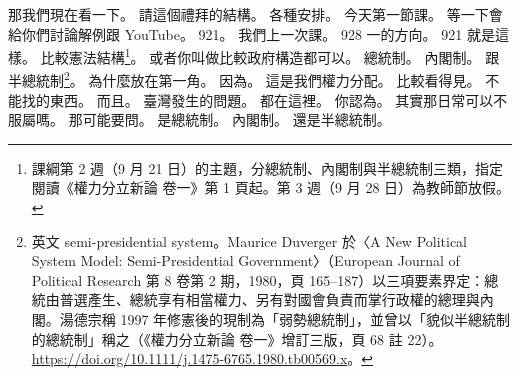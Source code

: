 \hypertarget{c01:cue:1122}{}那我們現在看一下。
\hypertarget{c01:cue:1123}{}請這個禮拜的結構。
\hypertarget{c01:cue:1124}{}各種安排。
\hypertarget{c01:cue:1125}{}今天第一節課。
\hypertarget{c01:cue:1126}{}等一下會給你們討論解例跟 YouTube。
\hypertarget{c01:cue:1127}{}921。
\hypertarget{c01:cue:1128}{}我們上一次課。
\hypertarget{c01:cue:1129}{}928 一的方向。
\hypertarget{c01:cue:1130}{}921 就是這樣。
\hypertarget{c01:cue:1131}{}比較憲法結構\footnote{課綱第 2 週（9 月 21 日）的主題，分總統制、內閣制與半總統制三類，指定閱讀《權力分立新論 卷一》第 1 頁起。第 3 週（9 月 28 日）為教師節放假。}。
\hypertarget{c01:cue:1132}{}或者你叫做比較政府構造都可以。
\hypertarget{c01:cue:1133}{}總統制。
\hypertarget{c01:cue:1134}{}內閣制。
\hypertarget{c01:cue:1135}{}跟半總統制\footnote{英文 semi-presidential system。Maurice Duverger 於〈A New Political System Model: Semi-Presidential Government〉（European Journal of Political Research 第 8 卷第 2 期，1980，頁 165–187）以三項要素界定：總統由普選產生、總統享有相當權力、另有對國會負責而掌行政權的總理與內閣。湯德宗稱 1997 年修憲後的現制為「弱勢總統制」，並曾以「貌似半總統制的總統制」稱之（《權力分立新論 卷一》增訂三版，頁 68 註 22）。\url{https://doi.org/10.1111/j.1475-6765.1980.tb00569.x}。}。
\hypertarget{c01:cue:1136}{}為什麼放在第一角。
\hypertarget{c01:cue:1137}{}因為。
\hypertarget{c01:cue:1138}{}這是我們權力分配。
\hypertarget{c01:cue:1139}{}比較看得見。
\hypertarget{c01:cue:1140}{}不能找的東西。
\hypertarget{c01:cue:1141}{}而且。
\hypertarget{c01:cue:1142}{}臺灣發生的問題。
\hypertarget{c01:cue:1143}{}都在這裡。
\hypertarget{c01:cue:1144}{}你認為。
\hypertarget{c01:cue:1145}{}其實那日常可以不服屬嗎。
\hypertarget{c01:cue:1146}{}那可能要問。
\hypertarget{c01:cue:1147}{}是總統制。
\hypertarget{c01:cue:1148}{}內閣制。
\hypertarget{c01:cue:1149}{}還是半總統制。

